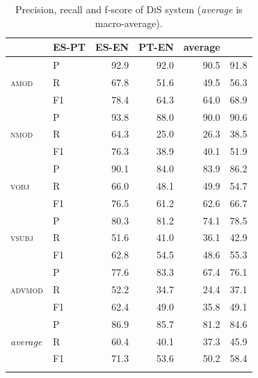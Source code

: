 \documentclass[output=paper,modfonts,nonflat]{langsci/langscibook}
\begin{document}
\begin{table}
  \begin{center}
    \caption{\label{tab:sys} Precision, recall and f-score of \textsc{DiS} system (\emph{average} is macro-average).}
    \begin{tabular}{llrrrr}
      \lsptoprule
      \multicolumn{2}{l}{\textbf{Pattern}} & \textbf{ES-PT} & \textbf{ES-EN} & \textbf{PT-EN} & \textbf{average}\\
      \midrule
	\multirow{3}{*}{\textsc{amod}} & P & 92.9 & 92.0 & 90.5 & 91.8\\ 
	& R & 67.8 & 51.6 & 49.5 & 56.3\\ 
	& F1 & 78.4 & 64.3 & 64.0 & 68.9\\ \midrule
	\multirow{3}{*}{\textsc{nmod}} & P & 93.8 & 88.0 & 90.0 & 90.6\\ 
	& R & 64.3 & 25.0 & 26.3 & 38.5\\ 
	& F1 & 76.3 & 38.9 & 40.1 & 51.9\\ \midrule
	\multirow{3}{*}{\textsc{vobj}} & P & 90.1 & 84.0 & 83.9 & 86.2\\ 
	& R & 66.0 & 48.1 & 49.9 & 54.7\\ 
	& F1 & 76.5 & 61.2 & 62.6 & 66.7\\ \midrule
	\multirow{3}{*}{\textsc{vsubj}} & P & 80.3 & 81.2 & 74.1 & 78.5\\ 
	& R & 51.6 & 41.0 & 36.1 & 42.9\\ 
	& F1 & 62.8 & 54.5 & 48.6 & 55.3\\ \midrule
	\multirow{3}{*}{\textsc{advmod}} & P & 77.6 & 83.3 & 67.4 & 76.1\\ 
	& R & 52.2 & 34.7 & 24.4 & 37.1\\ 
	& F1 & 62.4 & 49.0 & 35.8 & 49.1\\ \midrule
	\multirow{3}{*}{\emph{average}} & P & 86.9 & 85.7 & 81.2 & 84.6\\ 
	& R & 60.4 & 40.1 & 37.3 & 45.9\\ 
	& F1 & 71.3 & 53.6 & 50.2 & 58.4\\
      \lspbottomrule
    \end{tabular}
  \end{center}  
\end{table}
\end{document}
